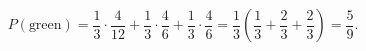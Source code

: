\[P(\text{green})=\dfrac{1}{3}\cdot\dfrac{4}{12}+\dfrac{1}{3}\cdot\dfrac{4}{6}+\dfrac{1}{3}\cdot\dfrac{4}{6}=\dfrac{1}{3}\left(\dfrac{1}{3}+\dfrac{2}{3}+\dfrac{2}{3}\right)=\boxed{\dfrac{5}{9}}.\]
